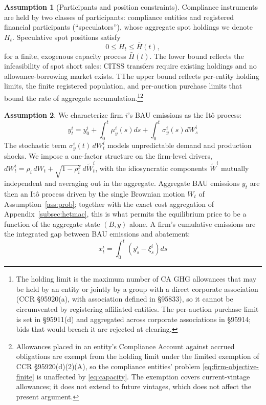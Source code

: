 \documentclass[11pt,letterpaper]{article}
\theoremstyle{plain}
\theoremstyle{definition}
\newtheorem{assumption}{Assumption}
\numberwithin{equation}{section}
\begin{document}
\begin{assumption}[Participants and position constraints]\label{ass:capacity}
Compliance instruments are held by two classes of participants: compliance entities and registered financial participants (``speculators''), whose aggregate spot holdings we denote $H_t$. Speculative spot positions satisfy
\begin{equation}\label{eq:capacity}
0 \leq H_t \leq \bar H(t),
\end{equation}
for a finite, exogenous capacity process $\bar H(t)$. The lower bound reflects the infeasibility of spot short sales: CITSS transfers require existing holdings and no allowance-borrowing market exists. TThe upper bound reflects per-entity holding limits, the finite registered population, and per-auction purchase limits that bound the rate of aggregate accumulation.\footnote{The holding limit is the maximum number of CA GHG allowances that may be held by an entity or jointly by a group with a direct corporate association (CCR \S95920(a), with association defined in \S95833), so it cannot be circumvented by registering affiliated entities. The per-auction purchase limit is set in \S95911(d) and aggregated across corporate associations in \S95914; bids that would breach it are rejected at clearing.}\footnote{Allowances placed in an entity's Compliance Account against accrued obligations are exempt from the holding limit under the limited exemption of CCR \S95920(d)(2)(A), so the compliance entities' problem \eqref{eq:firm-objective-finite} is unaffected by \eqref{eq:capacity}. The exemption covers current-vintage allowances; it does not extend to future vintages, which does not affect the present argument.}
\end{assumption}

\begin{assumption}\label{ass:emissions}
We characterize firm $i$'s BAU emissions as the Itô process:
\begin{equation}\label{eq:bauemissions}
y^i_t = y^i_0 + \int_0^t \mu_y^i(s)ds + \int_0^t \sigma_y^i(s)dW_s^i
\end{equation}
The stochastic term $\sigma_y^i(t)\,dW_t^i$ models unpredictable demand and production shocks. We impose a one-factor structure on the firm-level drivers, $dW_t^i=\rho_i\,dW_t+\sqrt{1-\rho_i^2}\,d\tilde W_t^i$, with the idiosyncratic components $\tilde W^i$ mutually independent and averaging out in the aggregate. Aggregate BAU emissions $y_t$ are then an It\^o process driven by the single Brownian motion $W_t$ of Assumption~\ref{ass:prob}; together with the exact cost aggregation of Appendix~\ref{subsec:hetmac}, this is what permits the equilibrium price to be a function of the aggregate state $(B,y)$ alone. A firm's cumulative emissions are the integrated gap between BAU emissions and abatement:
\begin{equation}\label{eq:cumemissions}
x_t^i = \int_0^t (y_s^i - \xi_s^i)ds
\end{equation}
\end{assumption}
\end{document}
